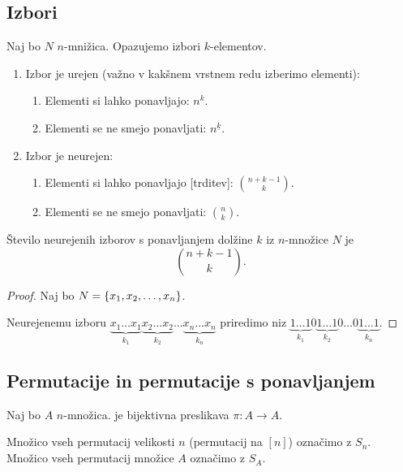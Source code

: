 \subsection{Izbori}
Naj bo $N$ $n$-mnižica. Opazujemo izbori $k$-elementov.
\begin{enumerate}
    \item Izbor je urejen (važno v kakšnem vrstnem redu izberimo elementi):
    \begin{enumerate}
        \item Elementi si lahko ponavljajo: $n^k$.
        \item Elementi se ne smejo ponavljati: $n^{\underline{k}}$.
    \end{enumerate}
    \item Izbor je neurejen:
    \begin{enumerate}
        \item Elementi si lahko ponavljajo [trditev]: $\binom{n+k-1}{k}$.
        \item Elementi se ne smejo ponavljati: $\binom{n}{k}$.
    \end{enumerate}
\end{enumerate}

\begin{trditev}
    Število neurejenih izborov s ponavljanjem dolžine $k$ iz $n$-množice $N$ je 
    $$\binom{n+k-1}{k}.$$
\end{trditev}

\begin{proof}
    Naj bo $N = \left\{x_1, x_2, \ldots, x_n\right\}$. 
    
    Neurejenemu izboru $\underbrace{x_1\ldots x_1}_{k_1} \underbrace{x_2 \ldots x_2}_{k_2} \ldots \underbrace{x_n \ldots x_n}_{k_n}$ priredimo niz $\underbrace{1 \ldots 1}_{k_1} 0 \underbrace{1 \ldots 1}_{k_2} 0 \ldots 0 \underbrace{1 \ldots 1}_{k_n}$.
\end{proof}

\subsection{Permutacije in permutacije s ponavljanjem}
\begin{definicija}
    Naj bo $A$ $n$-množica.  je bijektivna preslikava $\pi: A \to A$.

    Množico vseh permutacij velikosti $n$ (permutacij na $[n]$) označimo z $S_n$. 
    Množico vseh permutacij množice $A$ označimo z $S_A$.
\end{definicija}

